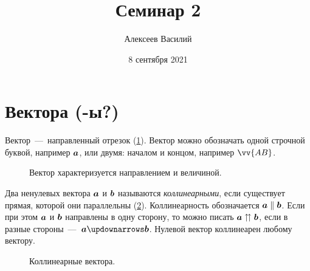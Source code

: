 \documentclass[a4paper,12pt]{article}
\author{Алексеев Василий}
\title{Семинар 2}
\date{8 сентября 2021}
\begin{document}
  \maketitle
  
  \tableofcontents

  \thispagestyle{empty}
  
  \newpage
  


  \section{Вектора (-ы?)}
  
  Вектор~---~направленный отрезок (\ref{fig:vector}).
  Вектор можно обозначать одной строчной буквой, например $\boldsymbol a$, или двумя: началом и концом, например $\vv{AB}$.
  
  \begin{figure}[h]
    \centering
    
    
    \caption{Вектор характеризуется направлением и величиной.}
    \label{fig:vector}
  \end{figure}
  
  \begin{definition}[Коллинеарность]
    Два ненулевых вектора $\boldsymbol a$ и $\boldsymbol b$ называются \emph{коллинеарными}, если существует прямая, которой они параллельны (\ref{fig:collinearity}).
    Коллинеарность обозначается $\bds a \hm\parallel \bds b$.
    Если при этом $\boldsymbol a$ и $\boldsymbol b$ направлены в одну сторону, то можно писать $\bds a \hm\upuparrows \bds b$,
    если в разные стороны~---~$\bds a \hm\updownarrows \bds b$.
    Нулевой вектор коллинеарен любому вектору.
  \end{definition}
  
  \begin{figure}[h]
    \centering
    
    
    \caption{Коллинеарные вектора.}
    \label{fig:collinearity}
  \end{figure}
  
\end{document}
